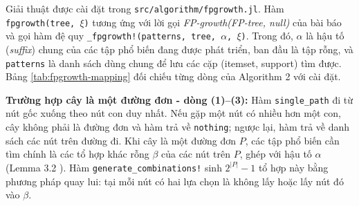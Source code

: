 \documentclass[conference]{IEEEtran}
\begin{document}
Giải thuật được cài đặt trong \texttt{src/algorithm/fpgrowth.jl}. Hàm \texttt{fpgrowth(tree, $\xi$)} tương ứng với lời gọi \textit{FP-growth(FP-tree, null)} của bài báo và gọi hàm đệ quy \texttt{\_fpgrowth!(patterns, tree, $\alpha$, $\xi$)}. Trong đó, $\alpha$ là hậu tố (\textit{suffix}) chung của các tập phổ biến đang được phát triển, ban đầu là tập rỗng, và \texttt{patterns} là danh sách dùng chung để lưu các cặp (itemset, support) tìm được. Bảng \ref{tab:fpgrowth-mapping} đối chiếu từng dòng của Algorithm 2 với cài đặt.

\begin{table}[htbp]
    \centering
    \caption{Đối chiếu Algorithm 2 \cite{han2000mining} với cài đặt}
    \label{tab:fpgrowth-mapping}
    \renewcommand{\arraystretch}{1.2}
\end{table}

\textbf{Trường hợp cây là một đường đơn - dòng (1)--(3):}
Hàm \texttt{single\_path} đi từ nút gốc xuống theo nút con duy nhất. Nếu gặp một nút có nhiều hơn một con, cây không phải là đường đơn và hàm trả về \texttt{nothing}; ngược lại, hàm trả về danh sách các nút trên đường đi. Khi cây là một đường đơn $P$, các tập phổ biến cần tìm chính là các tổ hợp khác rỗng $\beta$ của các nút trên $P$, ghép với hậu tố $\alpha$ (Lemma 3.2 \cite{han2000mining}). Hàm \texttt{generate\_combinations!} sinh $2^{|P|} - 1$ tổ hợp này bằng phương pháp quay lui: tại mỗi nút có hai lựa chọn là không lấy hoặc lấy nút đó vào $\beta$.
\end{document}

